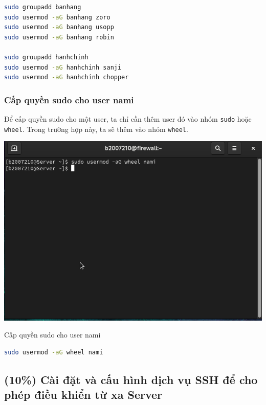 \documentclass[a4paper, 11pt]{article}
\begin{document}
\begin{lstlisting}[language=bash, caption=Tạo các nhóm còn lại và thêm người dùng vào]
sudo groupadd banhang
sudo usermod -aG banhang zoro
sudo usermod -aG banhang usopp
sudo usermod -aG banhang robin

sudo groupadd hanhchinh
sudo usermod -aG hanhchinh sanji
sudo usermod -aG hanhchinh chopper
\end{lstlisting}

\subsubsection{Cấp quyền sudo cho user nami}

Để cấp quyền sudo cho một user, ta chỉ cần thêm user đó vào nhóm \texttt{sudo} hoặc \texttt{wheel}.
Trong trường hợp này, ta sẽ thêm vào nhóm \texttt{wheel}.

\begin{minipage}
    {\linewidth}
    \captionsetup{type=figure}
    \centering
    \includegraphics[width=\linewidth]{images/wheel-nami.png}
    \caption{Cấp quyền sudo cho user nami}
    \label{figure:wheel-nami}
\end{minipage}

\begin{lstlisting}[language=bash, caption=Cấp quyền sudo cho user nami]
sudo usermod -aG wheel nami
\end{lstlisting}

\subsection{(10\%)  Cài đặt và cấu hình dịch vụ SSH để cho phép điều khiển từ xa Server}
\end{document}
